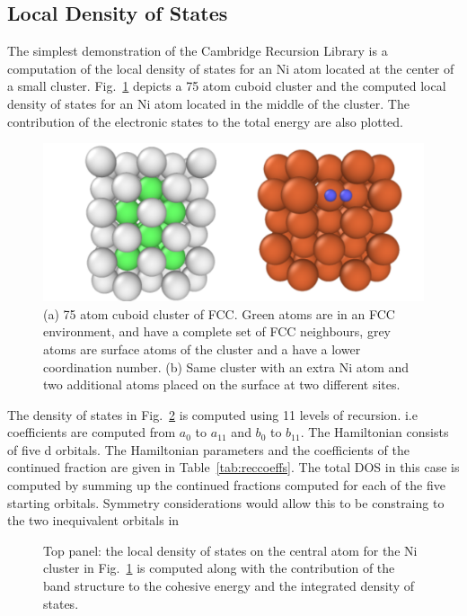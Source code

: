 \subsection{Local Density of States}
The simplest demonstration of the Cambridge Recursion Library 
is a computation of the local density of states for an Ni atom located at the center of a small cluster. 
Fig.~\ref{fig:cuboid} depicts a 75 atom cuboid cluster and the computed local density of states for an 
Ni atom located in the middle of the cluster. 
The contribution of the electronic states to the total energy are also plotted. 
%
\begin{figure}
\begin{center}
\includegraphics[width=\columnwidth]{./invariance/rec_examples/exrecal/combined.png}
\caption{(a) 75 atom cuboid cluster of FCC. Green atoms are in an FCC environment, and have a complete
set of FCC neighbours, grey atoms are surface atoms of the cluster and a have a lower coordination number.
(b) Same cluster with an extra Ni atom and two additional atoms placed on the surface at two different sites. 
\label{fig:cuboid}}
\end{center}
\end{figure}
%
The density of states in Fig.~\ref{fig:fcc_dos} is computed using 11 levels of recursion. i.e coefficients
are computed from $a_{0}$ to $a_{11}$ and $b_{0}$ to $b_11$. The Hamiltonian consists of five d orbitals.
The Hamiltonian parameters and the coefficients of the continued fraction are given in Table~\ref{tab:reccoeffs}.
The total DOS in this case is computed by summing up the continued fractions computed for each of the 
five starting orbitals. Symmetry considerations would allow this to be constraing to the two inequivalent 
orbitals in 

%
\begin{figure}
\begin{center}
{\graphicspath{{./invariance/rec_examples/exrecal/}}}
\caption{Top panel: the local density of states on the central atom for the Ni cluster in Fig.~\ref{fig:cuboid}
is computed along with the contribution of the band structure to the cohesive energy and the integrated
density of states.\label{fig:fcc_dos}}
\end{center}
\end{figure}

